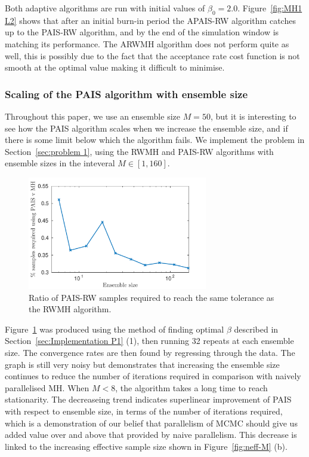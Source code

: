 \documentclass[final]{siamltex}
\begin{document}
Both adaptive algorithms are run with initial values of $\beta_0=2.0$. Figure~\ref{fig:MH1 L2} shows that after an initial burn-in period the APAIS-RW algorithm catches up to the PAIS-RW algorithm, and by the end of the simulation window is matching its performance. The ARWMH algorithm does not perform quite as well, this is possibly due to the fact that the acceptance rate cost function is not smooth at the optimal value making it difficult to minimise.

\subsubsection{Scaling of the PAIS algorithm with ensemble size}

Throughout this paper, we use an ensemble size $M=50$, but it is interesting to see how the PAIS algorithm scales when we increase the ensemble size, and if there is some limit below which the algorithm fails. We implement the problem in Section~\ref{sec:problem 1}, using the RWMH and PAIS-RW algorithms with ensemble sizes in the inteveral $M \in [1, 160]$.

\begin{figure}[h]
\begin{center}
\includegraphics[width=0.7\textwidth]{"figures/PAIS_saving"}
\caption{Ratio of PAIS-RW samples required to reach the same tolerance as the RWMH algorithm.}
\label{fig:PAIS_saving}
\end{center}
\end{figure}

Figure~\ref{fig:PAIS_saving} was produced using the method of finding
optimal $\beta$ described in Section~\ref{sec:Implementation P1} (1),
then running 32 repeats at each ensemble size. The convergence rates
are then found by regressing through the data. The graph is still very
noisy but demonstrates that increasing the ensemble size continues to
reduce the number of iterations required in comparison with naively parallelised MH. When $M<8$, the algorithm takes a long time to reach
stationarity. The decreaseing trend indicates superlinear improvement of PAIS with
respect to ensemble size, in terms of the number of iterations
required, which is a demonstration of our belief that parallelism of
MCMC should give us added value over and above that provided by naive parallelism. This decrease is linked to the increasing effective sample size shown in Figure~\ref{fig:neff-M} (b).
\end{document}
